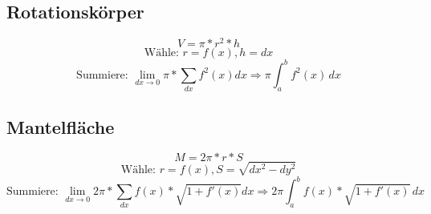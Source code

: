 \documentclass[11pt]{amsart}
\theoremstyle{remark}
\begin{document}
\subsection{Rotationsk\"orper}
\begin{equation*}
	V = \pi*r^2 * h
\end{equation*}
\begin{equation*}
	\text{W\"ahle: }r = f(x), h = dx
\end{equation*}
\begin{equation*}
	\text{Summiere: }\lim_{dx \to 0} \pi * \sum_{dx} f^2(x) dx \Rightarrow \pi \int_a^b f^2(x) \,dx
\end{equation*}

\subsection{Mantelfl\"ache}
\begin{equation*}
	M = 2\pi*r* S
\end{equation*}
\begin{equation*}
	\text{W\"ahle: }r = f(x), S = \sqrt{dx^2-dy^2}
\end{equation*}
\begin{equation*}
	\text{Summiere: }\lim_{dx \to 0} 2\pi * \sum_{dx} f(x)* \sqrt{1+f'(x)} dx \Rightarrow 2\pi \int_a^b f(x)*\sqrt{1+f'(x)} \,dx
\end{equation*}



\newpage 
\printindex
\end{document}
